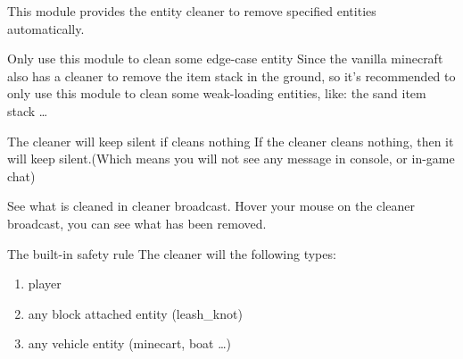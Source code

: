 \label{ch:cleaner}

This module provides the entity cleaner to remove specified entities automatically.

\begin{note}{Only use this module to clean some edge-case entity}
    Since the vanilla minecraft also has a cleaner to remove the item stack in the ground, so it's recommended to only use this module to clean some weak-loading entities, like: the sand item stack \ldots
\end{note}


\begin{note}{The cleaner will keep silent if cleans nothing}
    If the cleaner cleans nothing, then it will keep silent.(Which means you will not see any message in console, or in-game chat)
\end{note}

\begin{tips}{See what is cleaned in cleaner broadcast.}
    Hover your mouse on the cleaner broadcast, you can see what has been removed.
\end{tips}

\begin{samepage}
    \begin{note}{The built-in safety rule}
        The cleaner will  the following types:
        \begin{enumerate}
            \item player
            \item any block attached entity (\eg leash\_knot)
            \item any vehicle entity (\eg minecart, boat \ldots)
        \end{enumerate}
    \end{note}
\end{samepage}

